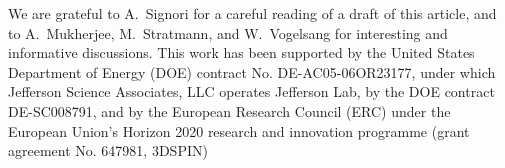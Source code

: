 \documentclass[preprintnumbers,floatfix,nofootinbib]{revtex4}
\begin{document}

\begin{acknowledgments}
We are grateful to A.~Signori for a careful reading of a draft of this article, and to A.~Mukherjee, M.~Stratmann, and W.~Vogelsang for interesting and informative discussions. This work has been supported by the United States Department of Energy (DOE) contract No. DE-AC05-06OR23177,
under which Jefferson Science Associates, LLC operates Jefferson Lab, by the DOE contract DE-SC008791, and 
by the European Research Council (ERC) under the European Union's 
Horizon 2020 research and innovation programme (grant agreement No. 647981,
3DSPIN)
\end{acknowledgments}



\end{document}
